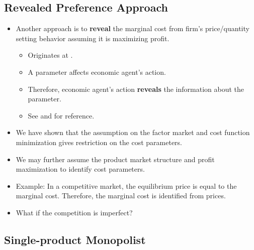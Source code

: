 \documentclass[
]{book}
\providecommand{\tightlist}{%
  \setlength{\itemsep}{0pt}\setlength{\parskip}{0pt}}
\begin{document}
\hypertarget{revealed-preference-approach}{%
\subsection{Revealed Preference Approach}\label{revealed-preference-approach}}

\begin{itemize}
\tightlist
\item
  Another approach is to \textbf{reveal} the marginal cost from firm's price/quantity setting behavior assuming it is maximizing profit.

  \begin{itemize}
  \tightlist
  \item
    Originates at \citet{rosseEstimatingCostFunction1970}.
  \item
    A parameter affects economic agent's action.
  \item
    Therefore, economic agent's action \textbf{reveals} the information about the parameter.
  \item
    See \citet{Bresnahan1981} and \citet{Bresnahan1989} for reference.
  \end{itemize}
\item
  We have shown that the assumption on the factor market and cost function minimization gives restriction on the cost parameters.
\item
  We may further assume the product market structure and profit maximization to identify cost parameters.
\item
  Example: In a competitive market, the equilibrium price is equal to the marginal cost. Therefore, the marginal cost is identified from prices.
\item
  What if the competition is imperfect?
\end{itemize}

\hypertarget{single-product-monopolist}{%
\subsection{Single-product Monopolist}\label{single-product-monopolist}}
\end{document}

